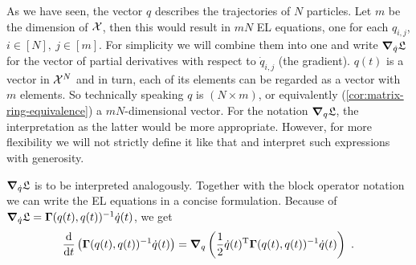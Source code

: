 As we have seen, the vector $q$ describes the trajectories of $N$ particles.
Let $m$ be the dimension of $\mathcal{X}$, then this would result in $mN$ EL equations, one for each $q_{i, j}$, $i \in [N],\ j \in [m]$.
For simplicity we will combine them into one and write $\grad_{\dot{q}} \mathfrak{L}$ for the vector of partial derivatives with respect to $\dot{q}_{i, j}$ (the gradient).
$q(t)$ is a vector in $\mathcal{X}^N$ and in turn, each of its elements can be regarded as a vector with $m$ elements.
So technically speaking $q$ is $(N \times m)$, or equivalently (\cref{cor:matrix-ring-equivalence}) a $mN$-dimensional vector.
For the notation $\grad_q \mathfrak{L}$, the interpretation as the latter would be more appropriate.
However, for more flexibility we will not strictly define it like that and interpret such expressions with generosity.

$\grad_{\dot{q}} \mathfrak{L}$ is to be interpreted analogously.
Together with the block operator notation we can write the EL equations in a concise formulation.
Because of $\grad_{\dot{q}} \mathfrak{L} = \mathbf{\Gamma}(q(t), q(t))^{-1} \dot{q}(t)$, we get
\begin{equation}
\label{eq:concrete-lagrangian}
	\frac{\mathrm{d}}{\mathrm{d}t} \left(\mathbf{\Gamma}(q(t), q(t))^{-1} \dot{q}(t) \right)
	= \grad_q \left(\frac{1}{2} \dot{q}(t)^\mathrm{T} \mathbf{\Gamma}(q(t), q(t))^{-1} \dot{q}(t)\right) \ .
\end{equation}
